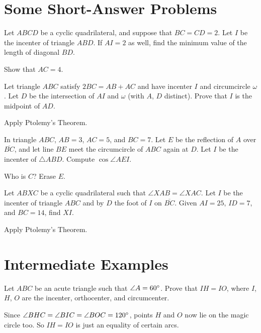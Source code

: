 \documentclass[11pt]{scrartcl}
\begin{document}
\section{Some Short-Answer Problems}
\begin{problem}
  [HMMT 2011] Let $ABCD$ be a cyclic quadrilateral, and suppose that $BC = CD = 2$.
  Let $I$ be the incenter of triangle $ABD$.
  If $AI = 2$ as well, find the minimum value of the length of diagonal $BD$.
  \begin{hint}
    Show that $AC = 4$.
  \end{hint}
\end{problem}
\begin{problem}
  [HMMT 2013] Let triangle $ABC$ satisfy $2BC = AB+AC$ and have incenter $I$ and circumcircle $\omega$.
  Let $D$ be the intersection of $AI$ and $\omega$ (with $A$, $D$ distinct).
  Prove that $I$ is the midpoint of $AD$.
  \begin{hint}
    Apply Ptolemy's Theorem.
  \end{hint}
\end{problem}

\begin{problem}
   In triangle $ABC$, $AB=3$, $AC=5$, and $BC=7$.
  Let $E$ be the reflection of $A$ over $\overline{BC}$,
  and let line $BE$ meet the circumcircle of $ABC$ again at $D$. Let $I$ be the incenter of $\triangle ABD$.
  Compute $\cos \angle AEI$.
  \begin{hint}
    Who is $C$? Erase $E$.
  \end{hint}
\end{problem}

\begin{problem}
  [NIMO 2012] Let $ABXC$ be a cyclic quadrilateral such that $\angle XAB = \angle XAC$.
  Let $I$ be the incenter of triangle $ABC$
  and by $D$ the foot of $I$ on $\overline{BC}$.
  Given $AI=25$, $ID = 7$, and $BC = 14$, find $XI$.
  \begin{hint}
    Apply Ptolemy's Theorem.
  \end{hint}
\end{problem}

\section{Intermediate Examples}
\begin{problem}
  Let $ABC$ be an acute triangle such that $\angle A = 60^\circ$.
  Prove that $IH = IO$, where $I$, $H$, $O$ are the incenter, orthocenter, and circumcenter.
  \begin{hint}
    Since $\angle BHC = \angle BIC = \angle BOC = 120^\circ$, points $H$ and $O$ now lie on the magic circle too.
    So $IH = IO$ is just an equality of certain arcs.
  \end{hint}
\end{problem}
\end{document}
